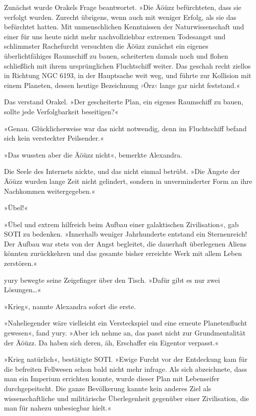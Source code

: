 Zunächst wurde Orakels Frage beantwortet. »Die Äöüzz befürchteten, dass sie verfolgt wurden. Zurecht übrigens, wenn auch mit weniger Erfolg, als sie das befürchtet hatten. Mit unmenschlichen Kenntnissen der Naturwissenschaft und einer für uns heute nicht mehr nachvollziehbar extremen Todesangst und schlimmster Rachefurcht versuchten die Äöüzz zunächst ein eigenes überlichtfähiges Raumschiff zu bauen, scheiterten damals noch und flohen schließlich mit ihrem ursprünglichen Fluchtschiff weiter. Das geschah recht ziellos in Richtung NGC 6193, in der Hauptsache weit weg, und führte zur Kollision mit einem Planeten, dessen heutige Bezeichnung ›Örz‹ lange gar nicht feststand.«

Das verstand Orakel. »Der gescheiterte Plan, ein eigenes Raumschiff zu bauen, sollte jede Verfolgbarkeit beseitigen?«

»Genau. Glücklicherweise war das nicht notwendig, denn im Fluchtschiff befand sich kein versteckter Peilsender.«

»Das wussten aber die Äöüzz nicht«, bemerkte Alexandra.

Die Seele des Internets nickte, und das nicht einmal betrübt. »Die Ängste der Äöüzz wurden lange Zeit nicht gelindert, sondern in unverminderter Form an ihre Nachkommen weitergegeben.«

»Übel!«

»Übel und extrem hilfreich beim Aufbau einer galaktischen Zivilisation«, gab SOTI zu bedenken. »Innerhalb weniger Jahrhunderte entstand ein Sternenreich! Der Aufbau war stets von der Angst begleitet, die dauerhaft überlegenen Aliens könnten zurückkehren und das gesamte bisher erreichte Werk mit allem Leben zerstören.«

yury bewegte seine Zeigefinger über den Tisch. »Dafür gibt es nur zwei Lösungen…«

»Krieg«, nannte Alexandra sofort die erste.

»Naheliegender wäre vielleicht ein Versteckspiel und eine erneute Planetenflucht gewesen«, fand yury. »Aber ich nehme an, das passt nicht zur Grundmentalität der Äöüzz. Da haben sich deren, äh, Erschaffer ein Eigentor verpasst.«

»Krieg natürlich«, bestätigte SOTI. »Ewige Furcht vor der Entdeckung kam für die befreiten Fellwesen schon bald nicht mehr infrage. Als sich abzeichnete, dass man ein Imperium errichten konnte, wurde dieser Plan mit Lebenseifer durchgepeitscht. Die ganze Bevölkerung kannte kein anderes Ziel als wissenschaftliche und militärische Überlegenheit gegenüber einer Zivilisation, die man für nahezu unbesiegbar hielt.«


